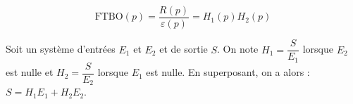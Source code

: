 %

\begin{defi}

$$\text{FTBO}(p)=\dfrac{R(p)}{\varepsilon(p)}=H_1(p) H_2(p)$$

\end{defi}

%
%
%
%
%
%
%

\begin{defi}
Soit un système d'entrées $E_1$ et $E_2$ et de sortie $S$. On note $H_1=\dfrac{S}{E_1}$ lorsque $E_2$ est nulle et $H_2=\dfrac{S}{E_2}$ lorsque $E_1$ est nulle. En superposant, on a alors : $S=H_1 E_1 + H_2 E_2$.
\end{defi}



